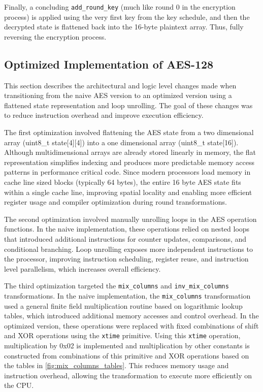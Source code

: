 Finally, a concluding \texttt{add\_round\_key} (much like round 0 in the encryption process) is applied using the very first key from the key schedule, and then the decrypted state is flattened back into the 16-byte plaintext array. Thus, fully reversing the encryption process.

\subsection{Optimized Implementation of AES-128}

This section describes the architectural and logic level changes made when transitioning from the naive AES version to an optimized version using a flattened state representation and loop unrolling. The goal of these changes was to reduce instruction overhead and improve execution efficiency.

The first optimization involved flattening the AES state from a two dimensional array (uint8\_t state[4][4]) into a one dimensional array (uint8\_t state[16]). Although multidimensional arrays are already stored linearly in memory, the flat representation simplifies indexing and produces more predictable memory access patterns in performance critical code. Since modern processors load memory in cache line sized blocks (typically 64 bytes), the entire 16 byte AES state fits within a single cache line, improving spatial locality and enabling more efficient register usage and compiler optimization during round transformations.

The second optimization involved manually unrolling loops in the AES operation functions. In the naive implementation, these operations relied on nested loops that introduced additional instructions for counter updates, comparisons, and conditional branching. Loop unrolling exposes more independent instructions to the processor, improving instruction scheduling, register reuse, and instruction level parallelism, which increases overall efficiency.

The third optimization targeted the \texttt{mix\_columns} and \texttt{inv\_mix\_columns} transformations. In the naive implementation, the \texttt{mix\_columns} transformation used a general finite field multiplication routine based on logarithmic lookup tables, which introduced additional memory accesses and control overhead. In the optimized version, these operations were replaced with fixed combinations of shift and XOR operations using the \texttt{xtime} primitive. Using this \texttt{xtime} operation, multiplication by 0x02 is implemented and multiplication by other constants is constructed from combinations of this primitive and XOR operations based on the tables in \ref{fig:mix_columns_tables}. This reduces memory usage and instruction overhead, allowing the transformation to execute more efficiently on the CPU.

